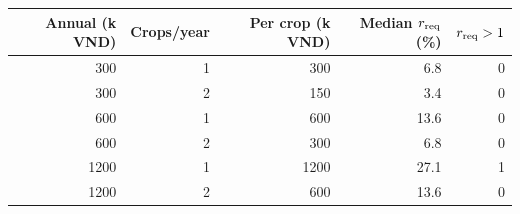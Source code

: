 \begin{tabular}{rrrrr}
\toprule
Annual (k VND) & Crops/year & Per crop (k VND) & Median $r_{\rm req}$ (\%) & $r_{\rm req}>1$ \\
\midrule
300 & 1 & 300 & 6.8 & 0 \\
300 & 2 & 150 & 3.4 & 0 \\
600 & 1 & 600 & 13.6 & 0 \\
600 & 2 & 300 & 6.8 & 0 \\
1200 & 1 & 1200 & 27.1 & 1 \\
1200 & 2 & 600 & 13.6 & 0 \\
\bottomrule
\end{tabular}